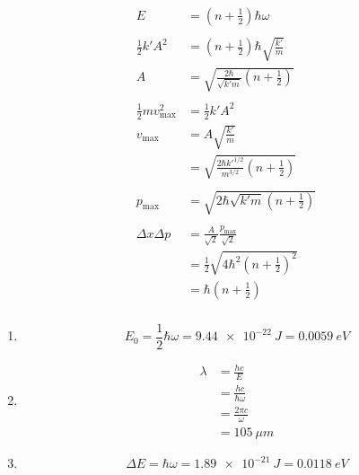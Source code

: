\documentclass{article}
\begin{document}
\setcounter{subsubsection}{38}
\subsubsection{}

\begin{align*}
  E                            & = \left( n + \frac{1}{2} \right) \hbar \omega                                \\ \\
  \frac{1}{2} k' A^2           & = \left( n + \frac{1}{2} \right) \hbar \sqrt{\frac{k'}{m}}                   \\
  A                            & = \sqrt{\frac{2 \hbar}{\sqrt{k' m}} \left( n + \frac{1}{2} \right)}          \\ \\
  \frac{1}{2} m v_\text{max}^2 & = \frac{1}{2} k' A^2                                                         \\
  v_\text{max}                 & = A \sqrt{\frac{k'}{m}}                                                      \\
                               & = \sqrt{\frac{2 \hbar k'^{1 / 2}}{m^{3 / 2}} \left( n + \frac{1}{2} \right)} \\ \\
  p_\text{max}                 & = \sqrt{2 \hbar \sqrt{k' m} \left( n + \frac{1}{2} \right)}                  \\ \\
  \Delta x \Delta p            & = \frac{A}{\sqrt{2}} \frac{p_\text{max}}{\sqrt{2}}                           \\
                               & = \frac{1}{2} \sqrt{4 \hbar^2 \left( n + \frac{1}{2} \right)^2}              \\
                               & = \hbar \left( n + \frac{1}{2} \right)
\end{align*}

\setcounter{subsubsection}{40}
\subsubsection{}

\begin{enumerate}
  \item \[E_0 = \frac{1}{2} \hbar \omega = \qty{9.44e-22}{J} = \qty{0.0059}{eV}\]

  \item

        \begin{align*}
          \lambda & = \frac{h c}{E}            \\
                  & = \frac{h c}{\hbar \omega} \\
                  & = \frac{2 \pi c}{\omega}   \\
                  & = \qty{105}{\mu m}
        \end{align*}

  \item \[\Delta E = \hbar \omega = \qty{1.89e-21}{J} = \qty{0.0118}{eV}\]
\end{enumerate}
\end{document}
